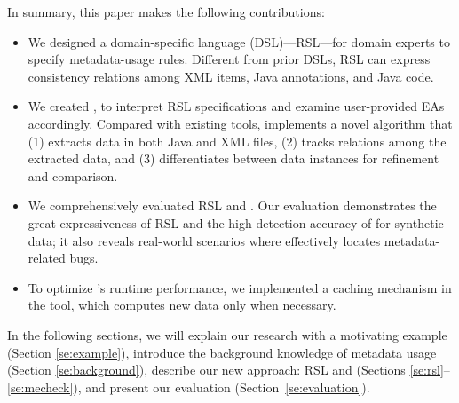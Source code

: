 In summary, this paper makes the following contributions: 
   	\begin{itemize}
   	    \item We designed a domain-specific language (DSL)---RSL---for domain experts to specify metadata-usage rules. Different from prior DSLs, RSL can express consistency relations among XML items, Java annotations, and Java code. %
   	    \item We created \tool, to interpret RSL specifications and examine user-provided EAs accordingly. Compared with existing tools, \tool implements a novel algorithm that (1) extracts data in both Java and XML files, (2) tracks relations among the extracted data, and (3)  differentiates between data instances for refinement and comparison. 
   	    \item We comprehensively evaluated RSL and \tool. Our evaluation demonstrates the great expressiveness of RSL and the high detection accuracy of \tool for synthetic data; it also reveals real-world scenarios where \tool effectively locates metadata-related bugs. 
       \item To optimize \tool's runtime performance, we implemented a caching mechanism in the tool, which computes new data only when necessary.
   	\end{itemize}
    
In the following sections, we will  explain our research with a motivating example (Section \ref{se:example}), introduce the background knowledge of metadata usage (Section \ref{se:background}), describe our new approach: RSL and \tool (Sections \ref{se:rsl}--\ref{se:mecheck}), and present our evaluation (Section~\ref{se:evaluation}). 	
